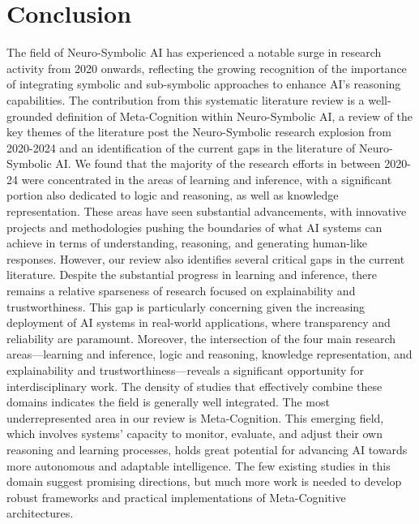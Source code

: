 \documentclass[hf]{ceurart}
\begin{document}
\section{Conclusion}\label{sec:conclusion}
The field of Neuro-Symbolic AI has experienced a notable surge in research activity from 2020 onwards, reflecting the growing recognition of the importance of integrating symbolic and sub-symbolic approaches to enhance AI's reasoning capabilities. The contribution from this systematic literature review is a well-grounded definition of Meta-Cognition within Neuro-Symbolic AI,  a review of the key themes of the literature post the Neuro-Symbolic research explosion from 2020-2024 and an identification of the current gaps in the literature of Neuro-Symbolic AI. We found that the majority of the research efforts in between 2020-24 were concentrated in the areas of learning and inference, with a significant portion also dedicated to logic and reasoning, as well as knowledge representation. These areas have seen substantial advancements, with innovative projects and methodologies pushing the boundaries of what AI systems can achieve in terms of understanding, reasoning, and generating human-like responses. However, our review also identifies several critical gaps in the current literature. Despite the substantial progress in learning and inference, there remains a relative sparseness of research focused on explainability and trustworthiness. This gap is particularly concerning given the increasing deployment of AI systems in real-world applications, where transparency and reliability are paramount. Moreover, the intersection of the four main research areas—learning and inference, logic and reasoning, knowledge representation, and explainability and trustworthiness—reveals a significant opportunity for interdisciplinary work. The density of studies that effectively combine these domains indicates the field is generally well integrated. The most underrepresented area in our review is Meta-Cognition. This emerging field, which involves systems' capacity to monitor, evaluate, and adjust their own reasoning and learning processes, holds great potential for advancing AI towards more autonomous and adaptable intelligence. The few existing studies in this domain suggest promising directions, but much more work is needed to develop robust frameworks and practical implementations of Meta-Cognitive architectures.

\renewcommand{\bibfont}{\scriptsize}
\setlength{\bibsep}{0pt}
\setlength{\itemsep}{0pt plus 0.3ex}



\appendix
\end{document}
